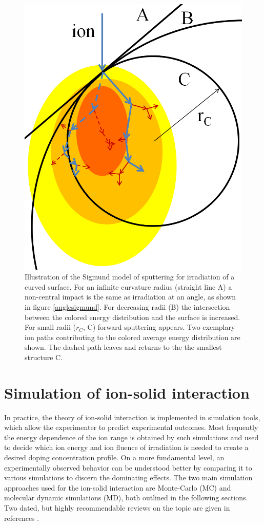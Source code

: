 \begin{figure}
	\centering
		\includegraphics[width=.4\textwidth]{images/radiussigmund.jpg}
	\caption{Illustration of the Sigmund model of sputtering for irradiation of a curved surface. For an infinite curvature radius (straight line A) a non-central impact is the same as irradiation at an angle, as shown in figure \ref{anglesigmund}. For decreasing radii (B) the intersection between the colored energy distribution and the surface is increased. For small radii ($r_C$, C) forward sputtering appears. Two exemplary ion paths contributing to the colored average energy distribution are shown. The dashed path leaves and returns to the the smallest structure C.}
	\label{radiussigmund}
\end{figure} 


\section{Simulation of ion-solid interaction}
\label{sec:simion}

In practice, the theory of ion-solid interaction is implemented in simulation tools, which allow the experimenter to predict experimental outcomes. Most frequently the energy dependence of the ion range is obtained by such simulations and used to decide which ion energy and ion fluence of irradiation is needed to create a desired doping concentration profile. On a more fundamental level, an experimentally observed behavior can be understood better by comparing it to various simulations to discern the dominating effects. The two main simulation approaches used for the ion-solid interaction are Monte-Carlo (MC) and molecular dynamic simulations (MD), both outlined in the following sections. Two dated, but highly recommendable reviews on the topic are given in references \cite{andersen_computer_1986,eckstein_computer_1991}.


